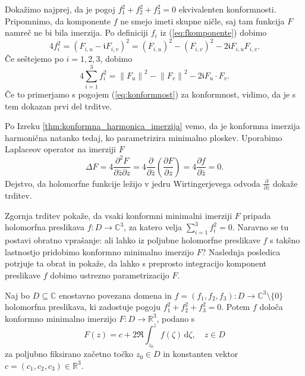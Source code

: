 \documentclass[fin1, tisk, bibtex]{fmfdelo}
\begin{document}
\begin{dokaz}
    Dokažimo najprej, da je pogoj $f_1^2+f_2^2+f_3^2=0$ ekvivalenten konformnosti. Pripomnimo, da komponente $f$ ne smejo imeti skupne ničle, saj tam funkcija $F$ namreč ne bi bila imerzija. Po definiciji $f_i$ iz (\ref{eq:fkomponente}) dobimo 
    \begin{equation*}
        4 f_i^2=\left(F_{i, u}-\mathfrak{i} F_{i, v}\right)^2=\left(F_{i, u}\right)^2-\left(F_{i, v}\right)^2-2 \mathfrak{i} F_{i, u} F_{i, v} .
    \end{equation*} 
    Če seštejemo po $i=1, 2, 3$, dobimo 
    \begin{equation*}
        4 \sum_{i=1}^3 f_i^2=\left\|F_u\right\|^2-\left\|F_v\right\|^2-2 \mathfrak{i} F_u \cdot F_v .
    \end{equation*}
    Če to primerjamo s pogojem (\ref{eq:konformnost}) za konformnost, vidimo, da je s tem dokazan prvi del trditve. 

    Po Izreku \ref{thm:konformna_harmonica_imerzija} vemo, da je konformna imerzija harmonična natanko tedaj, ko parametrizira minimalno ploskev. Uporabimo Laplaceov operator na imerziji $F$
    \begin{equation*}
        \Delta F = 4\frac{\partial^2 F}{\partial \bar{z} \partial z}= 4\frac{\partial}{\partial \bar{z}}\left(\frac{\partial F}{\partial z}\right)=4  \frac{\partial f}{\partial \bar{z}}=0.
    \end{equation*}
    Dejstvo, da holomorfne funkcije ležijo v jedru Wirtingerjevega odvoda $\frac{\partial}{\partial \bar{z}}$ dokaže trditev. 
\end{dokaz}

Zgornja trditev pokaže, da vsaki konformni minimalni imerziji $F$ pripada holomorfna preslikava $f: D \rightarrow \mathbb{C}^3$, za katero velja $\sum_{i=1}^3 f_i^2=0$. Naravno se tu postavi obratno vprašanje: ali lahko iz poljubne holomorfne preslikave $f$ s takšno lastnostjo pridobimo konformno minimalno imerzijo $F$? Naslednja posledica potrjuje ta obrat in pokaže, da lahko s preprosto integracijo komponent preslikave $f$ dobimo ustrezno parametrizacijo $F$.

\begin{posledica}
    Naj bo $D \subseteq \mathbb{C}$ enostavno povezana domena in $f=\left(f_1, f_2, f_3\right): D \rightarrow \mathbb{C}^3 \setminus \{0\}$ holomorfna preslikava, ki zadostuje pogoju $f_1^2 + f_2^2 + f_3^2 = 0$. Potem $f$ določa konformno minimalno imerzijo $F: D \rightarrow \mathbb{R}^3$, podano s
    \begin{equation}
        F(z) = c + 2 \Re \int_{z_0}^z f(\zeta) \, \mathrm{d} \zeta, \quad z \in D \label{eq:WE_reprezentacija}
    \end{equation}
    za poljubno fiksirano začetno točko $z_0 \in D$ in konstanten vektor $c = \left(c_1, c_2, c_3\right) \in \mathbb{R}^3$.
\end{posledica}
\end{document}
